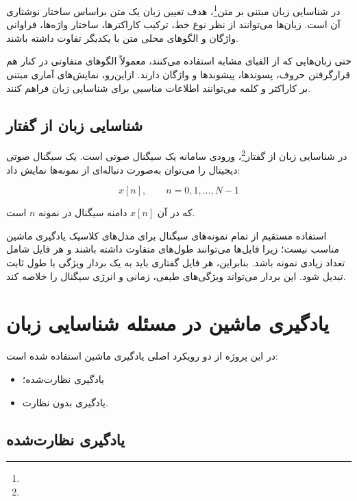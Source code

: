 در شناسایی زبان مبتنی بر متن\footnote{}، هدف تعیین زبان یک متن براساس ساختار نوشتاری آن است. زبان‌ها می‌توانند از نظر نوع خط، ترکیب کاراکترها، ساختار واژه‌ها، فراوانی واژگان و الگوهای محلی متن با یکدیگر تفاوت داشته باشند.

حتی زبان‌هایی که از الفبای مشابه استفاده می‌کنند، معمولاً الگوهای متفاوتی در کنار هم قرارگرفتن حروف، پسوندها، پیشوندها و واژگان دارند. ازاین‌رو، نمایش‌های آماری مبتنی بر کاراکتر و کلمه می‌توانند اطلاعات مناسبی برای شناسایی زبان فراهم کنند.


\subsection{شناسایی زبان از گفتار}

در شناسایی زبان از گفتار\footnote{}، ورودی سامانه یک سیگنال صوتی است. یک سیگنال صوتی دیجیتال را می‌توان به‌صورت دنباله‌ای از نمونه‌ها نمایش داد:

\begin{equation}
x[n], \qquad n=0,1,\ldots,N-1
\end{equation}

که در آن $x[n]$ دامنه سیگنال در نمونه $n$ است.

استفاده مستقیم از تمام نمونه‌های سیگنال برای مدل‌های کلاسیک یادگیری ماشین مناسب نیست؛ زیرا فایل‌ها می‌توانند طول‌های متفاوت داشته باشند و هر فایل شامل تعداد زیادی نمونه باشد. بنابراین، هر فایل گفتاری باید به یک بردار ویژگی با طول ثابت تبدیل شود. این بردار می‌تواند ویژگی‌های طیفی، زمانی و انرژی سیگنال را خلاصه کند.


\section{یادگیری ماشین در مسئله شناسایی زبان}

در این پروژه از دو رویکرد اصلی یادگیری ماشین استفاده شده است:

\begin{itemize}

	\item یادگیری نظارت‌شده؛

	\item یادگیری بدون نظارت.

\end{itemize}


\subsection{یادگیری نظارت‌شده}

